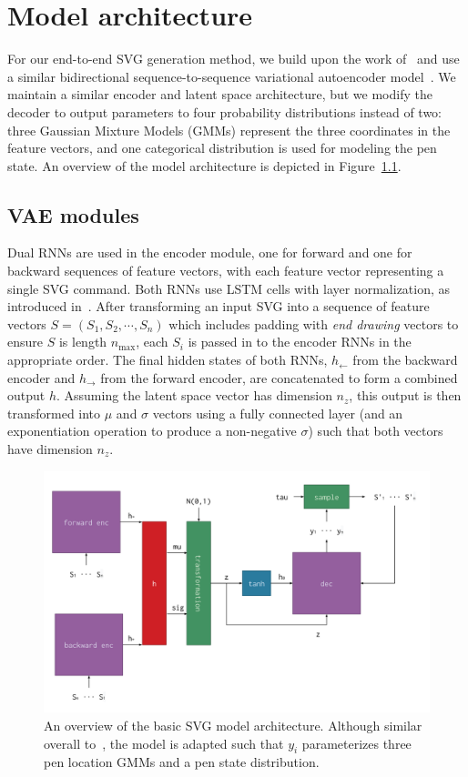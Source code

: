 \chapter{Model architecture}\label{chap:architecture}
For our end-to-end SVG generation method, we build upon the work of~\citeauthor{ha2017neural} and use a similar bidirectional sequence-to-sequence variational autoencoder model~\cite{ha2017neural}.
We maintain a similar encoder and latent space architecture, but we modify the decoder to output parameters to four probability distributions instead of two: three Gaussian Mixture Models (GMMs) represent the three coordinates in the feature vectors, and one categorical distribution is used for modeling the pen state.
An overview of the model architecture is depicted in Figure~\ref{fig:architecture}.

\section{VAE modules}
Dual RNNs are used in the encoder module, one for forward and one for backward sequences of feature vectors, with each feature vector representing a single SVG command.
Both RNNs use LSTM cells with layer normalization, as introduced in~\cite{ba2016layer}.
After transforming an input SVG into a sequence of feature vectors $S = (S_1, S_2, \cdots, S_n)$ which includes padding with \textit{end drawing} vectors to ensure $S$ is length $n_\text{max}$, each $S_i$ is passed in to the encoder RNNs in the appropriate order.
The final hidden states of both RNNs, $h_\leftarrow$ from the backward encoder and $h_\to$ from the forward encoder, are concatenated to form a combined output $h$.
Assuming the latent space vector has dimension $n_z$, this output is then transformed into $\mu$ and $\sigma$ vectors using a fully connected layer (and an exponentiation operation to produce a non-negative $\sigma$) such that both vectors have dimension $n_z$.

\begin{figure}[h]
\centering
\caption[An overview of the basic SVG model architecture]{An overview of the basic SVG model architecture.
Although similar overall to~\cite{ha2017neural}, the model is adapted such that $y_i$ parameterizes three pen location GMMs and a pen state distribution.\label{fig:architecture}}
\includegraphics[width=\textwidth]{figures/architecture}
\end{figure}

